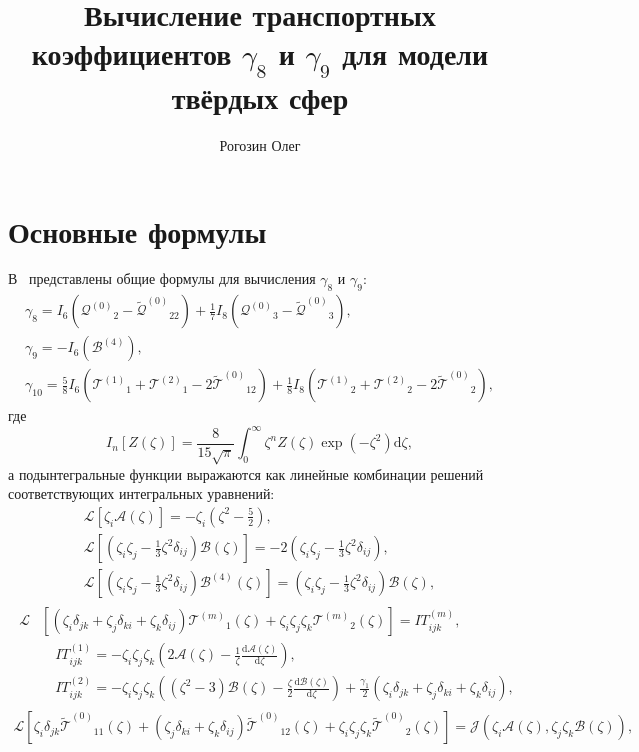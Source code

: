 \documentclass[a4paper,12pt]{article}
\title{Вычисление транспортных коэффициентов \(\gamma_8\) и \(\gamma_9\) для модели твёрдых сфер}
\author{Рогозин Олег}
\newcommand{\dd}{\mathrm{d}}
\newcommand{\der}[2][]{\frac{\dd#1}{\dd#2}}
\newcommand{\B}{\ensuremath{\mathcal{B}^{(4)}}}
\newcommand{\Q}{\ensuremath{\mathcal{Q}^{(0)}}}
\newcommand{\T}[1]{\ensuremath{\mathcal{T}^{(#1)}}}
\newcommand{\TT}{\ensuremath{\tilde{\mathcal{T}}^{(0)}}}
\newcommand{\QQ}{\ensuremath{\tilde{\mathcal{Q}}^{(0)}}}
\newcommand{\ZD}[2]{\zeta_{#1}\delta_{#2}}
\newcommand{\ZZZ}{\zeta_i\zeta_j\zeta_k}
\begin{document}
\maketitle
\tableofcontents

\section{Основные формулы}

В~\cite{Sone2000, Sone2002} представлены общие формулы для вычисления \(\gamma_8\) и \(\gamma_9\):
\begin{gather}
    \gamma_8 = I_6\left(\Q_2 - \QQ_{22}\right) + \frac17 I_8\left(\Q_3 - \QQ_3\right), \label{eq:gamma_8}\\
    \gamma_9 = -I_6\left(\B\right), \label{eq:gamma_9}\\
    \gamma_{10} = \frac58 I_6\left(\T{1}_1 + \T{2}_1 - 2\TT_{12}\right)
        + \frac18 I_8\left(\T{1}_2 + \T{2}_2 - 2\TT_2\right), \label{eq:gamma_10}
\end{gather}
где
\begin{equation}\label{eq:I_n}
    I_n[Z(\zeta)] = \frac{8}{15\sqrt\pi} \int_0^\infty \zeta^n Z(\zeta) \exp(-\zeta^2) \dd\zeta,
\end{equation}
а подынтегральные функции выражаются как линейные комбинации решений соответствующих интегральных уравнений:
\begin{gather}
    \mathcal{L}\left[\zeta_i\mathcal{A}(\zeta)\right] = -\zeta_i\left(\zeta^2-\frac52\right), \label{eq:A}\\[6pt]
    \mathcal{L}\left[\left(\zeta_i\zeta_j-\frac13\zeta^2\delta_{ij}\right)\mathcal{B}(\zeta)\right] =
        -2\left(\zeta_i\zeta_j-\frac13\zeta^2\delta_{ij}\right), \label{eq:B}\\[6pt]
    \mathcal{L}\left[\left(\zeta_i\zeta_j-\frac13\zeta^2\delta_{ij}\right)\B(\zeta)\right] =
        \left(\zeta_i\zeta_j-\frac13\zeta^2\delta_{ij}\right)\mathcal{B}(\zeta), \label{eq:B_4}
\end{gather}
\begin{gather}
    \begin{aligned}
    \mathcal{L}&\left[(\ZD{i}{jk}+\ZD{j}{ki}+\ZD{k}{ij})\T{m}_1(\zeta) + \ZZZ\T{m}_2(\zeta)\right] = IT^{(m)}_{ijk}, \\
        &\quad IT^{(1)}_{ijk} = -\ZZZ\left( 2\mathcal{A}(\zeta) - \frac1\zeta \der[\mathcal{A}(\zeta)]{\zeta} \right), \\
        &\quad IT^{(2)}_{ijk} = -\ZZZ\left( (\zeta^2-3)\mathcal{B}(\zeta) - \frac\zeta2 \der[\mathcal{B}(\zeta)]{\zeta} \right)
        + \frac{\gamma_1}{2} (\ZD{i}{jk}+\ZD{j}{ki}+\ZD{k}{ij}),
    \end{aligned}\label{eq:T}\\
    \mathcal{L}\left[\ZD{i}{jk}\TT_{11}(\zeta)+(\ZD{j}{ki}+\ZD{k}{ij})\TT_{12}(\zeta) + \ZZZ\TT_2(\zeta)\right]
        = \mathcal{J}(\zeta_i\mathcal{A}(\zeta), \zeta_j\zeta_k\mathcal{B}(\zeta)), \label{eq:TT}
\end{gather}
\end{document}
